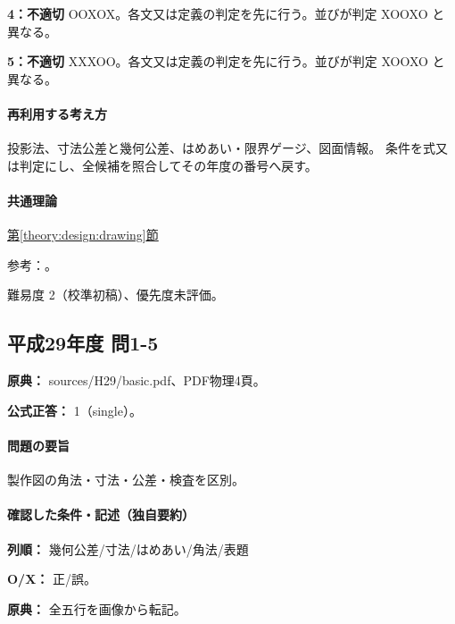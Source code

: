 \noindent\textbf{4：不適切} OOXOX。各文又は定義の判定を先に行う。並びが判定 XOOXO と異なる。\par

\noindent\textbf{5：不適切} XXXOO。各文又は定義の判定を先に行う。並びが判定 XOOXO と異なる。\par

\paragraph{再利用する考え方} 投影法、寸法公差と幾何公差、はめあい・限界ゲージ、図面情報。 条件を式又は判定にし、全候補を照合してその年度の番号へ戻す。

\paragraph{共通理論} \hyperref[theory:design:drawing]{第\ref*{theory:design:drawing}節}

\par 参考：\cite{design48_iso}。

\par 難易度 2（校準初稿）、優先度未評価。

\subsection{平成29年度 問1-5}
\label{q:h29-reg-basic-1-5}

\noindent\textbf{原典：} sources/H29/basic.pdf、PDF物理4頁。

\textbf{公式正答：} 1（single）。

\paragraph{問題の要旨} 製作図の角法・寸法・公差・検査を区別。

\paragraph{確認した条件・記述（独自要約）}\mbox{}\par

\noindent\textbf{列順：} 幾何公差/寸法/はめあい/角法/表題\par

\noindent\textbf{O/X：} 正/誤。\par

\noindent\textbf{原典：} 全五行を画像から転記。\par

